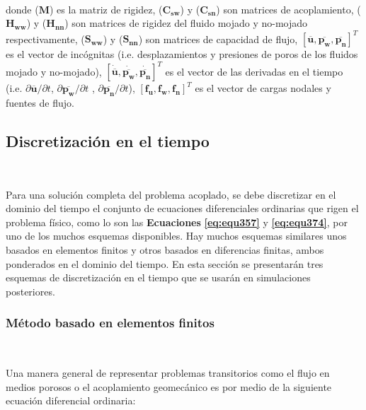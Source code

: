 \\
donde ($\mathbf{M}$) es la matriz de rigidez, ($\mathbf{C_{sw}}$) y ($\mathbf{C_{sn}}$) son matrices de acoplamiento, ($\mathbf{H_{ww}}$) y ($\mathbf{H_{nn}}$) son matrices de rigidez del fluido mojado y no-mojado respectivamente, ($\mathbf{S_{ww}}$) y ($\mathbf{S_{nn}}$) son matrices de capacidad de flujo, $[\mathbf{\overline{u}}, \mathbf{\overline{p_w}}, \mathbf{\overline{p_n}}]^T$ es el vector de incógnitas (i.e. desplazamientos y presiones de poros de los fluidos mojado y no-mojado),  $[\mathbf{\dot{\overline{u}}},\mathbf{\dot{\overline{p_w}}},\mathbf{\dot{\overline{p_n}}} ]^T$ es el vector de las derivadas en el tiempo (i.e. $\partial \mathbf{\overline{u}}/\partial t$, $\partial \mathbf{\overline{p_w}}/\partial t$ , $\partial \mathbf{\overline{p_n}}/\partial t$), $[\mathbf{f_u}, \mathbf{f_w}, \mathbf{f_n} ]^T$ es el vector de cargas nodales y fuentes de flujo.


\subsection{Discretización en el tiempo}~\hypertarget{sec:sec342}{}
\label{sec:sec342}

Para una solución completa del problema acoplado, se debe discretizar en el dominio del tiempo el conjunto de ecuaciones diferenciales ordinarias que rigen el problema físico, como lo son las \textbf{Ecuaciones} \textbf{\ref{eq:equ357}} y \textbf{\ref{eq:equ374}}, por uno de los muchos esquemas disponibles. Hay muchos esquemas similares unos basados en elementos finitos y otros basados en diferencias finitas, ambos ponderados en el dominio del tiempo. En esta sección se presentarán tres esquemas de discretización en el tiempo que se usarán en simulaciones posteriores.\bigskip


\subsubsection{Método basado en elementos finitos}~\hypertarget{sec:sec3421}{}
\label{sec:sec3421}


Una manera general de representar problemas transitorios como el flujo en medios porosos o el acoplamiento geomecánico es por medio de la siguiente ecuación diferencial ordinaria:\bigskip

